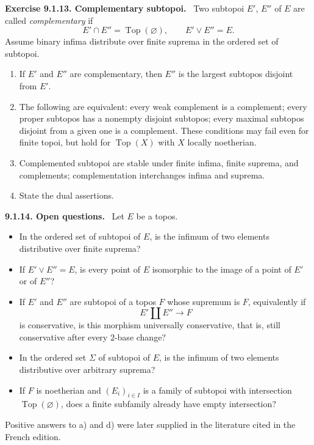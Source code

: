 \documentclass[11pt]{article}
\newcommand{\Top}{\operatorname{Top}}
\newcommand{\emptytopos}{\Top(\varnothing)}
\newenvironment{remarktext}[1]{\par\medskip\noindent\textbf{#1.}\ }{\par\medskip}
\begin{document}
\begin{remarktext}{Exercise 9.1.13. Complementary subtopoi}
Two subtopoi \(E'\), \(E''\) of \(E\) are called \emph{complementary} if
\[
E'\cap E''=\emptytopos,\qquad E'\vee E''=E.
\]
Assume binary infima distribute over finite suprema in the ordered set of subtopoi.
\begin{enumerate}[label=\alph*)]
\item If \(E'\) and \(E''\) are complementary, then \(E''\) is the largest subtopos disjoint from \(E'\).
\item The following are equivalent: every weak complement is a complement; every proper subtopos has a nonempty disjoint subtopos; every maximal subtopos disjoint from a given one is a complement. These conditions may fail even for finite topoi, but hold for \(\Top(X)\) with \(X\) locally noetherian.
\item Complemented subtopoi are stable under finite infima, finite suprema, and complements; complementation interchanges infima and suprema.
\item State the dual assertions.
\end{enumerate}
\end{remarktext}

\begin{remarktext}{9.1.14. Open questions}
Let \(E\) be a topos.
\begin{itemize}
\item[a)] In the ordered set of subtopoi of \(E\), is the infimum of two elements distributive over finite suprema?
\item[b)] If \(E'\vee E''=E\), is every point of \(E\) isomorphic to the image of a point of \(E'\) or of \(E''\)?
\item[c)] If \(E'\) and \(E''\) are subtopoi of a topos \(F\) whose supremum is \(F\), equivalently if
\[
E'\amalg E''\longrightarrow F
\tag{9.1.14.1}
\]
is conservative, is this morphism universally conservative, that is, still conservative after every \(2\)-base change?
\item[d)] In the ordered set \(\Sigma\) of subtopoi of \(E\), is the infimum of two elements distributive over arbitrary suprema?
\item[e)] If \(F\) is noetherian and \((E_i)_{i\in I}\) is a family of subtopoi with intersection \(\emptytopos\), does a finite subfamily already have empty intersection?
\end{itemize}
Positive answers to a) and d) were later supplied in the literature cited in the French edition.
\end{remarktext}
\end{document}
